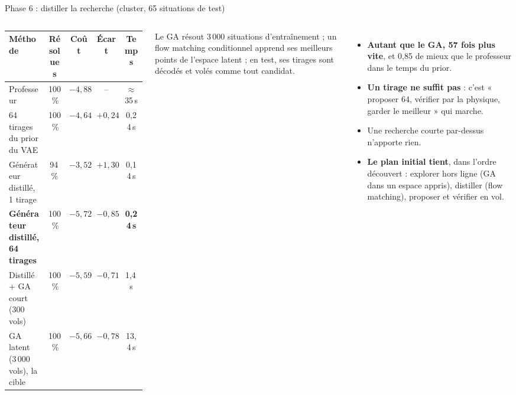 \documentclass[aspectratio=169,10pt]{beamer}
\newcommand{\good}[1]{\textcolor{climb}{\textbf{#1}}}
\begin{document}
\begin{frame}{Phase 6 : distiller la recherche (cluster, 65 situations de test)}
  \begin{columns}[T]
    \scriptsize
    \begin{tabular}{@{}lcccc@{}}
      \toprule
      Méthode & Résolues & Coût & Écart & Temps \\ \midrule
      Professeur & 100\,\% & $-4{,}88$ & -- & $\approx$35\,s \\
      64 tirages du prior du VAE & 100\,\% & $-4{,}64$ & $+0{,}24$ & 0{,}24\,s \\
      Générateur distillé, 1 tirage & 94\,\% & $-3{,}52$ & $+1{,}30$ & 0{,}14\,s \\
      \textbf{Générateur distillé, 64 tirages} & 100\,\% & \good{$-5{,}72$} & \good{$-0{,}85$} & \good{0{,}24\,s} \\
      Distillé + GA court (300 vols) & 100\,\% & $-5{,}59$ & $-0{,}71$ & 1{,}4\,s \\
      GA latent (3\,000 vols), la cible & 100\,\% & $-5{,}66$ & $-0{,}78$ & 13{,}4\,s \\
      \bottomrule
    \end{tabular}\par\medskip
    \small Le GA résout 3\,000 situations d'entraînement ; un flow matching conditionnel apprend ses meilleurs points de l'espace latent ; en test, ses tirages sont décodés et volés comme tout candidat.
    \small
    \begin{itemize}
      \item \good{Autant que le GA, 57 fois plus vite}, et 0{,}85 de mieux que le professeur dans le temps du prior.
      \item \textbf{Un tirage ne suffit pas} : c'est « proposer 64, vérifier par la physique, garder le meilleur » qui marche.
      \item Une recherche courte par-dessus n'apporte rien.
      \item \textbf{Le plan initial tient}, dans l'ordre découvert : explorer hors ligne (GA dans un espace appris), distiller (flow matching), proposer et vérifier en vol.
    \end{itemize}
  \end{columns}
\end{frame}
\end{document}
